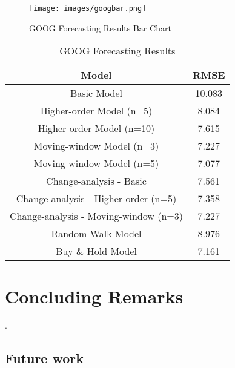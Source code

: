 \documentclass[12pt, oneside, a4paper]{article}
\theoremstyle{definition}
\begin{document}
\begin{figure}[H]
    \centering
    \caption{GOOG Forecasting Results Bar Chart}
    \texttt{[image: images/googbar.png]}
    \label{googbar}
\end{figure}

\begin{table}[H]
	\center
	\begin{tabulary}{1.0\textwidth}{CC}
	\toprule[.15em]
	Model & RMSE \\
	\toprule[.15em]
	Basic Model & 10.083 \\
	\hline
	Higher-order Model (n=5) & 8.084\\
	\hline
	Higher-order Model (n=10) & 7.615\\
	\hline
	Moving-window Model (n=3) & 7.227\\
	\hline
	Moving-window Model (n=5) & 7.077\\
	\hline
	Change-analysis - Basic & 7.561\\
	\hline
	Change-analysis - Higher-order (n=5) & 7.358\\
	\hline
	Change-analysis - Moving-window (n=3) & 7.227\\
	\hline
	Random Walk Model & 8.976\\
	\hline
	Buy \& Hold Model & 7.161\\
  	\toprule[.15em]
	\end{tabulary}
	\caption{GOOG Forecasting Results}
	\label{googresults}
\end{table}

\section{Concluding Remarks}
.

\subsection{Future work}
\end{document}
